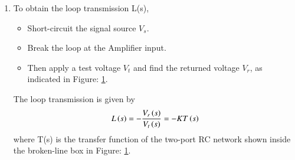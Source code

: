 \begin{enumerate}[label=\arabic*.,ref=\theenumi]
\item 

\solution To obtain the loop transmission L(s),
\begin{itemize}
\item Short-circuit the signal source $V_s$.
\item Break the loop at the Amplifier input.
\item Then apply a test voltage $V_t$ and find the returned voltage $V_r$, as indicated in Figure: \ref{fig:ee18btech11030_fig1}.
\end{itemize}

\begin{figure}[!ht]
	\begin{center}
		\resizebox{\columnwidth/1}{!}{}
	\end{center}
	\caption{}
	\label{fig:ee18btech11030_fig1}
\end{figure}

The loop transmission is given by
\begin{align}
    L\brak{s} = -\frac{V_r\brak{s}}{V_t\brak{s}} = -KT\brak{s}
\label{eq:ee18btech11030}
\end{align}
where T(s) is the transfer function of the two-port RC network shown inside the broken-line box in Figure: \ref{fig:ee18btech11030_fig1}.


\end{enumerate}
